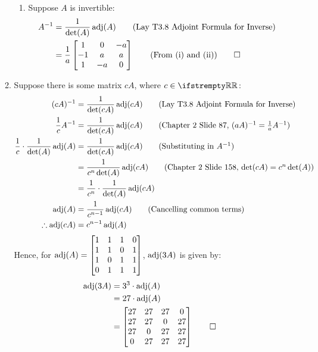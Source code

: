 \documentclass[12pt, a4paper]{article}
\begin{document}
\begin{enumerate}[Q\arabic*.]
\begin{enumerate}[(\alph*)]
\begin{enumerate}[(\roman*)]
      \item Suppose $A$ is invertible:
        \begin{align*}
          A^{-1} &= \frac{1}{\det(A)}\operatorname{adj}(A)\tag*{(Lay T3.8 Adjoint Formula for Inverse)}\\
                 &= \frac{1}{a}\begin{bmatrix}1&0&-a\\-1&a&a\\1&-a&0\end{bmatrix}\tag*{(From (i) and (ii))}\qed
        \end{align*}
        \end{enumerate}

      \item Suppose there is some matrix $cA$, where $c \in \RR$:
        \begin{align*}
          (cA)^{-1} &= \frac{1}{\det(cA)}\adj(cA)\tag*{(Lay T3.8 Adjoint Formula for Inverse)}\\
          \frac{1}{c}A^{-1} &= \frac{1}{\det(cA)}\adj(cA) \tag*{\text{(Chapter 2 Slide 87, $(aA)^{-1} = \frac{1}{a}A^{-1}$)}}\\
          \frac{1}{c} \cdot \frac{1}{\det(A)}\adj(A) &= \frac{1}{\det(cA)}\adj(cA) \tag*{\text{(Substituting in $A^{-1}$)}}\\
                                                     &= \frac{1}{c^n\det(A)}\adj(cA)\tag*{(Chapter 2 Slide 158, $\det(cA) = c^n\det(A)$)}\\
                                                     &= \frac{1}{c^n} \cdot \frac{1}{\det(A)}\adj(cA)\\
          \adj(A) &= \frac{1}{c^{n-1}} \adj(cA) \tag*{\text{(Cancelling common terms)}}\\
          \therefore \adj(cA) &= c^{n-1}\adj(A)
        \end{align*}
        Hence, for $\operatorname{adj}(A) = \begin{bmatrix}1&1&1&0\\1&1&0&1\\1&0&1&1\\0&1&1&1\end{bmatrix}$, $\operatorname{adj}(3A)$ is given by:
        \begin{align*}
          \operatorname{adj}(3A) &= 3^3 \cdot \operatorname{adj}(A)\\
                   &= 27\cdot \operatorname{adj}(A)\\
                   &= \begin{bmatrix}27&27&27&0\\27&27&0&27\\27&0&27&27\\0&27&27&27\end{bmatrix} \qed
        \end{align*}
    \end{enumerate}
\end{enumerate}
\end{document}
